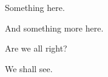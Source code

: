 \documentclass{article}
\begin{document}
	\begin{hEnumerateArabic}
		\item
		\begin{hEnumerateAlpha}
			\item Something here.
			\item And something more here.
		\end{hEnumerateAlpha}

		\item
		\begin{hEnumerateRoman}
			\item Are we all right?
			\item We shall see.
		\end{hEnumerateRoman}
	\end{hEnumerateArabic}
\end{document}
